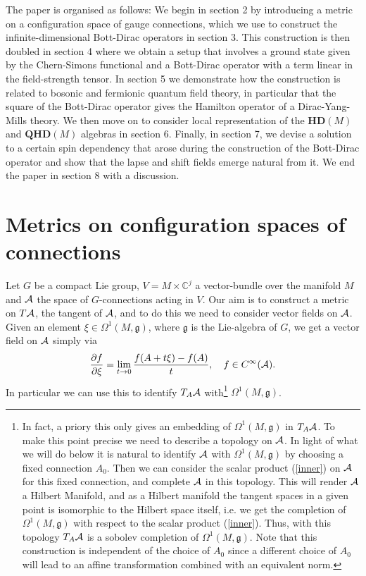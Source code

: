 \documentclass[letterpaper,11pt]{article}
\def\OO{\Omega}
\def\ca{{\cal A}}
\newcommand{\pa}{\partial}
\begin{document}
The paper is organised as follows: We begin in section 2 by introducing a metric on a configuration space of gauge connections, which we use to construct the infinite-dimensional Bott-Dirac operators in section 3. This construction is then doubled in section 4 where we obtain a setup that involves a ground state given by the Chern-Simons functional and a Bott-Dirac operator with a term linear in the field-strength tensor. In section 5 we demonstrate how the construction is related to bosonic and fermionic quantum field theory, in particular that the square of the Bott-Dirac operator gives the Hamilton operator of a Dirac-Yang-Mills theory. We then move on to consider local representation of the $\mathbf{HD}(M)$ and $\mathbf{QHD}(M)$ algebras in section 6. Finally, in section 7, we devise a solution to a certain spin dependency that arose during the construction of the Bott-Dirac operator and show that the lapse and shift fields emerge natural from it. We end the paper in section 8 with a discussion.







\section{Metrics on configuration spaces of connections}
\label{ovn2}




Let $G$ be a compact Lie group, $V=M\times \mathbb{C}^j$ a vector-bundle over the manifold $M$ and $\ca$ the space of $G$-connections acting in $V$. Our aim is to construct a metric on $T\ca$, the tangent of $\ca$, and to do this we need to consider vector fields on $\ca$. Given an element $\xi\in \OO^1(M, \mathfrak{g})$, where $\mathfrak{g}$ is the Lie-algebra of $G$, we get a vector field on $\ca$ simply via 
\begin{equation}
\frac{\pa f}{\pa \xi} = \lim_{t\rightarrow 0} \frac{f(A + t\xi) - f(A)}{t}, \quad f\in C^\infty(\ca).
\label{mozart}
\end{equation}
In particular we can use this to identify $T_A\ca  $  with\footnote{In fact, a priory this only gives an embedding of $\Omega^1(M,\mathfrak{g})$ in $T_A\ca$. To make this point precise we need to describe a topology on $\ca$. In light of what we will do below it is natural to identify $\ca$ with $\Omega^1(M,\mathfrak{g})$ by choosing a fixed connection $A_0$. Then we can consider the scalar product (\ref{inner}) on $\ca$ for this fixed connection, and complete $\ca$ in this topology. This will render $\ca$ a Hilbert Manifold, and as a Hilbert manifold the tangent spaces in a given point is isomorphic to the Hilbert space itself, i.e. we get the completion of $\Omega^1 (M,\mathfrak{g})$ with respect to the scalar product (\ref{inner}). Thus, with this topology $T_A\ca$ is a sobolev completion of $\Omega^1 (M,\mathfrak{g})$.
Note that this construction is independent of the choice of $A_0$ since a different choice of $A_0$ will lead to an affine transformation combined with an equivalent norm.  } $\OO^1(M, \mathfrak{g})$.
\end{document}
